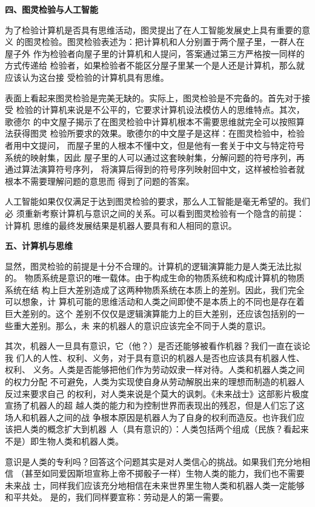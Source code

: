 \textbf{四、图灵检验与人工智能}

为了检验计算机是否具有思维活动，图灵提出了在人工智能发展史上具有重要的意义
的图灵检验。图灵检验表述为：把计算机和人分别置于两个屋子里，一群人在屋子外
作为检验者向屋子里的计算机和人提问，答案通过第三方严格按一同样的方式传递给
检验者，如果检验者不能区分屋子里某一个是人还是计算机，那么就应该认为这台接
受检验的计算机具有思维。

表面上看起来图灵检验是完美无缺的。实际上，图灵检验是不完备的。首先对于接受
检验的计算机来说是不公平的，它要求计算机设法模仿人的思维特点。其次，歌德尔
的中文屋子揭示了在图灵检验中计算机根本不需要思维就完全可以按照算法获得图灵
检验所要求的效果。歌德尔的中文屋子是这样：在图灵检验中，检验者用中文提问，
而屋子里的人根本不懂中文，但是他有一套关于中文与特定符号系统的映射集，因此
屋子里的人可以通过这套映射集，分解问题的符号序列，再通过算法演算符号序列，
将演算后得到的符号序列映射回中文，这样被检验者就根本不需要理解问题的意思而
得到了问题的答案。

人工智能如果仅仅满足于达到图灵检验的要求，那么人工智能是毫无希望的。我们必
须重新考察计算机与意识之间的关系。可以看到图灵检验有一个隐含的前提：计算机
思维的最终发展结果是机器人要具有和人相同的意识。

\textbf{五、计算机与思维}

显然，图灵检验的前提是十分不合理的。计算机的逻辑演算能力是人类无法比拟的。
物质系统是意识的唯一载体。由于构成生命的物质系统和构成计算机的物质系统在结
构上巨大差别造成了这两种物质系统在本质上的差别。因此，我们完全可以想象，计
算机可能的思维活动和人类之间即使不是本质上的不同也是存在着巨大差别的。这个
差别不仅仅是逻辑演算能力上的巨大差别，还应该包括别的一些重大差别。那么，未
来的机器人的意识应该完全不同于人类的意识。

其次，机器人一旦具有意识，它（他？）是否还能够被看作机器？我们一直在谈论我
们人的人性、权利、义务，对于具有意识的机器人是否也应该具有机器人性、权利、
义务。人类是否能够把他们作为劳动奴隶一样对待。人类和机器人类之间的权力分配
不可避免，人类为实现使自身从劳动解脱出来的理想而制造的机器人反过来要求自己
的权利，对人类来说是个莫大的讽刺。《未来战士》这部影片极度宣扬了机器人的超
越人类的能力和为控制世界而表现出的残忍，但是人们忘了这场人和机器人之间的战
争根本原因是机器人为了自身的权利而造反。也许我们应该把人类的概念扩大到机器
人（具有意识的）：人类包括两个组成（民族？看起来不是）即生物人类和机器人类。

意识是人类的专利吗？回答这个问题其实是对人类信心的挑战。如果我们充分地相信
（甚至如同爱因斯坦宣称上帝不掷骰子一样）生物人类的能力，我们也不需要未来战
士，同样我们应该充分地相信在未来世界里生物人类和机器人类一定能够和平共处。
是的，我们同样要宣称：劳动是人的第一需要。
